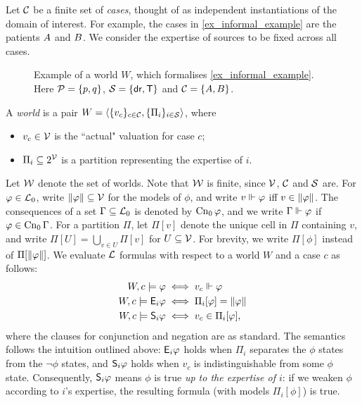 Let $\css$ be a finite set of \emph{cases}, thought of as independent
instantiations of the domain of interest. For example, the cases in
\cref{ex_informal_example} are the patients $\patientA{}$ and $\patientB{}$. We
consider the expertise of sources to be fixed across all cases.

\begin{figure}
    \centering
    
    \caption{
        Example of a world $W$, which formalises \cref{ex_informal_example}.
        Here $\propvars = \{p, q\}$, $\srcs = \{\dr{}, \tech{}\}$ and $\css =
        \{\patientA{}, \patientB{}\}$.
    }
    \label{fig_example_world}
\end{figure}

A \emph{world} is a pair $W = \tuple{\{v_c\}_{c \in \css},
\{\Pi_i\}_{i \in \srcs}}$, where
\begin{itemize}
    \item $v_c \in \vals$ is the ``actual" valuation for case $c$;
    \item $\Pi_i \subseteq 2^\vals$ is a partition representing the
          expertise of $i$.
\end{itemize}

Let $\worlds$ denote the set of worlds. Note that $\worlds$ is finite, since
$\vals$, $\css$ and $\srcs$ are.
%
For $\phi \in \Lprop$, write $\propmods{\phi} \subseteq \vals$ for the
models of $\phi$, and write $v \propmodels \phi$ iff $v \in \propmods{\phi}$.
The consequences of a set $\Gamma \subseteq \Lprop$ is denoted by
$\cnprop{\phi}$, and we write $\Gamma \propmodels \phi$ if $\phi \in
\cnprop{\Gamma}$.
%
For a partition $\Pi$, let $\Pi[v]$ denote the unique cell in $\Pi$ containing
$v$, and write $\Pi[U] = \bigcup_{v \in U}{\Pi[v]}$ for $U \subseteq
\vals$. For brevity, we write $\Pi[\phi]$ instead of
$\Pi[\propmods{\phi}]$. We evaluate $\L$ formulas with respect to a world $W$
and a case $c$ as follows:
\begin{align*}
    W, c \models \phi &\iff v_c \propmodels \phi \\
    W, c \models \E_i\phi &\iff \Pi_i[\phi] = \propmods{\phi} \\
    W, c \models \S_i\phi &\iff v_c \in \Pi_i[\phi],
\end{align*}
where the clauses for conjunction and negation are as standard. The semantics
follows the intuition outlined above: $\E_i\phi$ holds when $\Pi_i$ separates
the $\phi$ states from the $\neg\phi$ states, and $\S_i\phi$ holds when $v_c$
is indistinguishable from some $\phi$ state. Consequently, $\S_i\phi$ means
$\phi$ is true \emph{up to the expertise of $i$}: if we weaken $\phi$ according
to $i$'s expertise, the resulting formula (with models $\Pi_i[\phi]$) is true.

